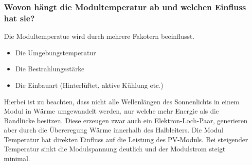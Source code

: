 \subsubsection{Wovon hängt die Modultemperatur ab und welchen Einfluss hat sie?}
Die Modultemperatue wird durch mehrere Fakotern beeinflusst.
\begin{itemize}
    \item Die Umgebungstemperatur
    \item Die Bestrahlungsstärke
    \item Die Einbauart (Hinterlüftet, aktive Kühlung etc.)
\end{itemize}
Hierbei ist zu beachten, dass nicht alle Wellenlängen des Sonnenlichts in einem Modul in Wärme umgewandelt werden, nur welche mehr Energie als die Bandlücke besitzen.
Diese erzeugen zwar auch ein Elektron-Loch-Paar, generieren aber durch die Übereregung Wärme innerhalb des Halbleiters.
Die Modul Temperatur hat direkten Einfluss auf die Leistung des PV-Moduls.
Bei steigender Temperatur sinkt die Modulspannung deutlich und der Modulstrom steigt minimal.
